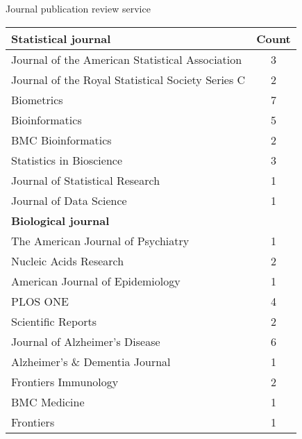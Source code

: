 \documentclass{resume} %
\begin{document}
\newpage

\begin{rSection}{Journal publication review service}

\begin{table}[htp]
\begin{center}
\begin{tabular}{l c }
\hline
\hline
\bf{Statistical journal} & Count \\
\hline
Journal of the American Statistical Association & 3 \\
Journal of the Royal Statistical Society Series C & 2 \\
Biometrics & 7 \\
Bioinformatics & 5 \\
BMC Bioinformatics & 2 \\
Statistics in Bioscience & 3 \\
Journal of Statistical Research & 1 \\
Journal of Data Science & 1 \\
\hline
\hline
\bf{Biological journal} &  \\
\hline
The American Journal of Psychiatry & 1 \\
Nucleic Acids Research & 2 \\
American Journal of Epidemiology & 1 \\
PLOS ONE & 4 \\
Scientific Reports & 2 \\
Journal of Alzheimer's Disease & 6 \\
Alzheimer's \& Dementia Journal & 1 \\
Frontiers Immunology & 2 \\
BMC Medicine & 1 \\
Frontiers  & 1 \\
\hline
\hline
\end{tabular}
\end{center}
\label{default}
\end{table}%


\end{rSection}
\end{document}
